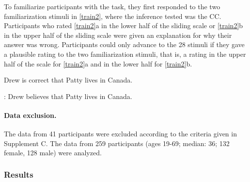\documentclass{language}
\newcommand{\6}{\mbox{$[\hspace*{-.6mm}[$}}
\newcommand{\9}{\mbox{$]\hspace*{-.6mm}]$}}
\begin{document}
To familiarize participants with the task, they first responded to the two familiarization stimuli in \ref{train2}, where the inference tested was the CC. Participants who rated \ref{train2}a in the lower half of the sliding scale or \ref{train2}b in the upper half of the sliding scale were given an explanation for why their answer was wrong. Participants could only advance to the 28 stimuli if they gave a plausible rating to the two familiarization stimuli, that is, a rating in the upper half of the scale for \ref{train2}a and in the lower half for \ref{train2}b.

\begin{exe}
\ex\label{train2}
\begin{xlist}
 Drew is correct that Patty lives in Canada. 

: Drew believes that Patty lives in Canada.
\end{xlist}
\end{exe}


\paragraph{Data exclusion.} The data from 41 participants were excluded according to the criteria given in Supplement C. The data from 259 participants (ages 19-69; median: 36; 132 female, 128 male) were analyzed.


\subsubsection{Results}
\end{document}
